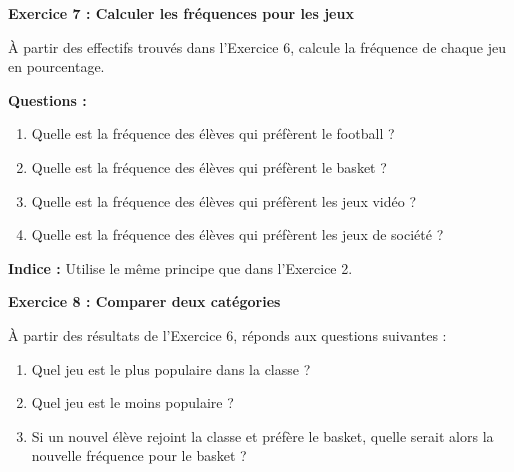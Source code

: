 \documentclass{article}
\begin{document}
\begin{tcolorbox}[colback=green!10!white, colframe=yellow!75!black, title=\textcolor{white}{Exercices}]
\vspace{0.35cm}

\textbf{Exercice 7 : Calculer les fréquences pour les jeux}

À partir des effectifs trouvés dans l'Exercice 6, calcule la fréquence de chaque jeu en pourcentage.

\textbf{Questions :}
\begin{enumerate}
    \item Quelle est la fréquence des élèves qui préfèrent le football ?
    \item Quelle est la fréquence des élèves qui préfèrent le basket ?
    \item Quelle est la fréquence des élèves qui préfèrent les jeux vidéo ?
    \item Quelle est la fréquence des élèves qui préfèrent les jeux de société ?
\end{enumerate}

\textbf{Indice :} Utilise le même principe que dans l'Exercice 2.

\vspace{0.35cm}

\textbf{Exercice 8 : Comparer deux catégories}

À partir des résultats de l'Exercice 6, réponds aux questions suivantes :
\begin{enumerate}
    \item Quel jeu est le plus populaire dans la classe ?
    \item Quel jeu est le moins populaire ?
    \item Si un nouvel élève rejoint la classe et préfère le basket, quelle serait alors la nouvelle fréquence pour le basket ?
\end{enumerate}
\end{tcolorbox}
\end{document}
